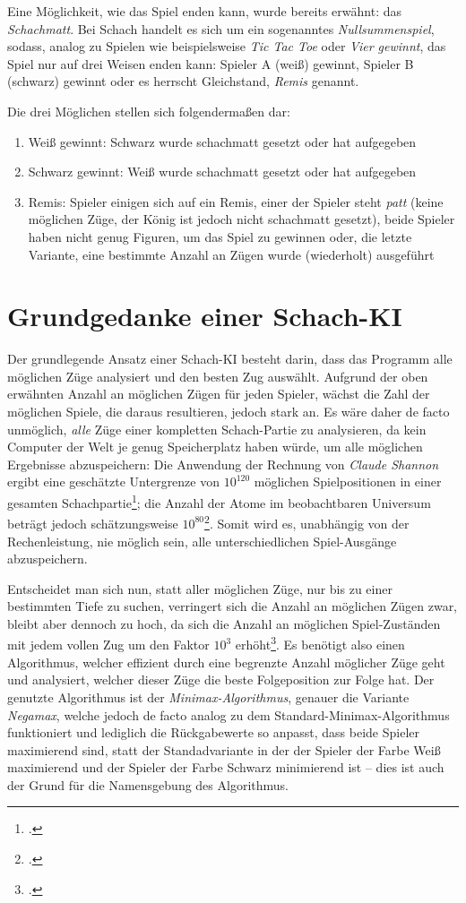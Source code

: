 Eine Möglichkeit, wie das Spiel enden kann, wurde bereits erwähnt: das \textit{Schachmatt}. Bei Schach handelt es sich um ein sogenanntes \textit{Nullsummenspiel}, sodass, analog zu Spielen wie beispielsweise \textit{Tic Tac Toe} oder \textit{Vier gewinnt}, das Spiel nur auf drei Weisen enden kann: Spieler A (weiß) gewinnt, Spieler B (schwarz) gewinnt oder es herrscht Gleichstand, \textit{Remis} genannt.

Die drei Möglichen stellen sich folgendermaßen dar:

\begin{enumerate}
    \item Weiß gewinnt: Schwarz wurde schachmatt gesetzt oder hat aufgegeben
    \item Schwarz gewinnt: Weiß wurde schachmatt gesetzt oder hat aufgegeben
    \item Remis: Spieler einigen sich auf ein Remis, einer der Spieler steht \textit{patt} (keine möglichen Züge, der König ist jedoch nicht schachmatt gesetzt), beide Spieler haben nicht genug Figuren, um das Spiel zu gewinnen oder, die letzte Variante, eine bestimmte Anzahl an Zügen wurde (wiederholt) ausgeführt
\end{enumerate}

\section{Grundgedanke einer Schach-KI}
Der grundlegende Ansatz einer Schach-KI besteht darin, dass das Programm alle möglichen Züge analysiert und den besten Zug auswählt. Aufgrund der oben erwähnten Anzahl an möglichen Zügen für jeden Spieler, wächst die Zahl der möglichen Spiele, die daraus resultieren, jedoch stark an. Es wäre daher de facto unmöglich, \textit{alle} Züge einer kompletten Schach-Partie zu analysieren, da kein Computer der Welt je genug Speicherplatz haben würde, um alle möglichen Ergebnisse abzuspeichern: Die Anwendung der Rechnung von \textit{Claude Shannon} ergibt eine geschätzte Untergrenze von $10^{120}$ möglichen Spielpositionen in einer gesamten Schachpartie\footcite{shannon}; die Anzahl der Atome im beobachtbaren Universum beträgt jedoch schätzungsweise $10^{80}$\footcite{merz}. Somit wird es, unabhängig von der Rechenleistung, nie möglich sein, alle unterschiedlichen Spiel-Ausgänge abzuspeichern.

Entscheidet man sich nun, statt aller möglichen Züge, nur bis zu einer bestimmten Tiefe zu suchen, verringert sich die Anzahl an möglichen Zügen zwar, bleibt aber dennoch zu hoch, da sich die Anzahl an möglichen Spiel-Zuständen mit jedem vollen Zug um den Faktor $10^{3}$ erhöht\footcite{shannon}. Es benötigt also einen Algorithmus, welcher effizient durch eine begrenzte Anzahl möglicher Züge geht und analysiert, welcher dieser Züge die beste Folgeposition zur Folge hat. Der genutzte Algorithmus ist der \textit{Minimax-Algorithmus}, genauer die Variante \textit{Negamax}, welche jedoch de facto analog zu dem Standard-Minimax-Algorithmus funktioniert und lediglich die Rückgabewerte so anpasst, dass beide Spieler maximierend sind, statt der Standadvariante in der der Spieler der Farbe Weiß maximierend und der Spieler der Farbe Schwarz minimierend ist -- dies ist auch der Grund für die Namensgebung des Algorithmus.

